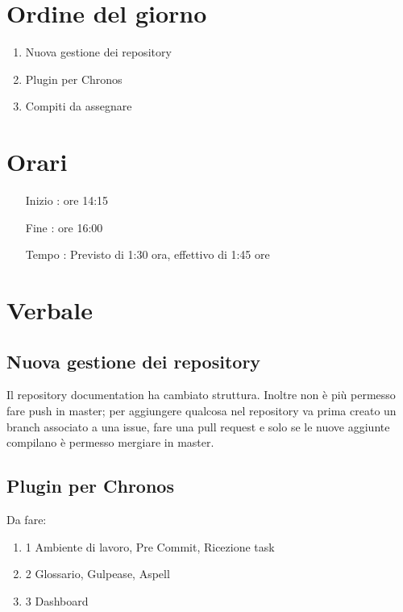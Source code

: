 \documentclass[11pt]{meetingmins}
\begin{document}
\maketitle

\section{Ordine del giorno}

\begin{enumerate}

  \item Nuova gestione dei repository
  \item Plugin per Chronos
  \item Compiti da assegnare

\end{enumerate}

\section{Orari}

\begin{itemize}
\item[Inizio]: ore 14:15
\item[Fine]: ore 16:00
\item[Tempo]: Previsto di 1:30 ora, effettivo di 1:45 ore

\end{itemize}

\section{Verbale}

\subsection{Nuova gestione dei repository}
Il repository documentation ha cambiato struttura. Inoltre non è più permesso fare push in master; per aggiungere qualcosa nel repository va prima creato un branch associato a una issue, fare una pull request e solo se le nuove aggiunte compilano è permesso mergiare in master.

\subsection{Plugin per Chronos}

Da fare:

\begin{enumerate}
\item 1 Ambiente di lavoro, Pre Commit, Ricezione task
\item 2 Glossario, Gulpease, Aspell
\item 3 Dashboard
\end{enumerate}
\end{document}

